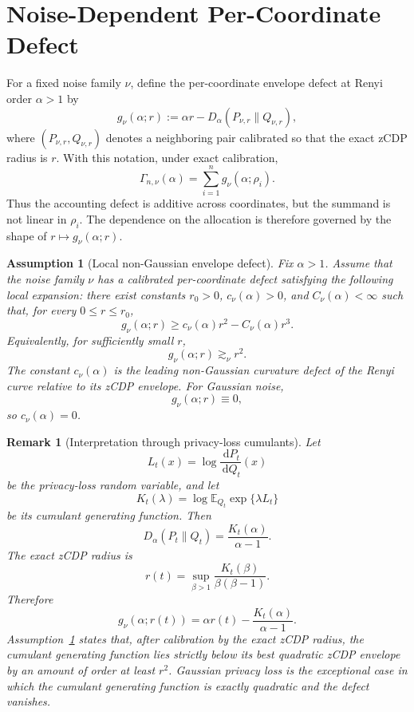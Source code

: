 \documentclass[11pt]{article}
\newtheorem{assumption}{Assumption}
\newtheorem{remark}{Remark}
\newcommand{\E}{\mathbb E}
\newcommand{\dd}{\,\mathrm d}
\begin{document}
\section{Noise-Dependent Per-Coordinate Defect}

For a fixed noise family \(\nu\), define the per-coordinate envelope defect at
Renyi order \(\alpha>1\) by
\[
g_\nu(\alpha;r)
:=
\alpha r-D_\alpha(P_{\nu,r}\|Q_{\nu,r}),
\]
where \((P_{\nu,r},Q_{\nu,r})\) denotes a neighboring pair calibrated so that the
exact zCDP radius is \(r\). With this notation, under exact calibration,
\[
\Gamma_{n,\nu}(\alpha)
=
\sum_{i=1}^n g_\nu(\alpha;\rho_i).
\]
Thus the accounting defect is additive across coordinates, but the summand is
not linear in \(\rho_i\). The dependence on the allocation is therefore governed
by the shape of \(r\mapsto g_\nu(\alpha;r)\).

\begin{assumption}[Local non-Gaussian envelope defect]
\label{ass:local-defect}
Fix \(\alpha>1\). Assume that the noise family \(\nu\) has a calibrated
per-coordinate defect satisfying the following local expansion: there exist
constants \(r_0>0\), \(c_\nu(\alpha)>0\), and \(C_\nu(\alpha)<\infty\) such that,
for every \(0\le r\le r_0\),
\[
g_\nu(\alpha;r)
\ge
c_\nu(\alpha)r^2-C_\nu(\alpha)r^3.
\]
Equivalently, for sufficiently small \(r\),
\[
g_\nu(\alpha;r)
\gtrsim_\nu r^2.
\]
The constant \(c_\nu(\alpha)\) is the leading non-Gaussian curvature defect of
the Renyi curve relative to its zCDP envelope. For Gaussian noise,
\[
g_\nu(\alpha;r)\equiv 0,
\]
so \(c_\nu(\alpha)=0\).
\end{assumption}

\begin{remark}[Interpretation through privacy-loss cumulants]
Let
\[
L_t(x)
=
\log\frac{\dd P_t}{\dd Q_t}(x)
\]
be the privacy-loss random variable, and let
\[
K_t(\lambda)
=
\log \E_{Q_t}\exp\{\lambda L_t\}
\]
be its cumulant generating function. Then
\[
D_\alpha(P_t\|Q_t)
=
\frac{K_t(\alpha)}{\alpha-1}.
\]
The exact zCDP radius is
\[
r(t)
=
\sup_{\beta>1}
\frac{K_t(\beta)}{\beta(\beta-1)}.
\]
Therefore
\[
g_\nu(\alpha;r(t))
=
\alpha r(t)-\frac{K_t(\alpha)}{\alpha-1}.
\]
Assumption~\ref{ass:local-defect} states that, after calibration by the exact
zCDP radius, the cumulant generating function lies strictly below its best
quadratic zCDP envelope by an amount of order at least \(r^2\). Gaussian privacy
loss is the exceptional case in which the cumulant generating function is exactly
quadratic and the defect vanishes.
\end{remark}
\end{document}
